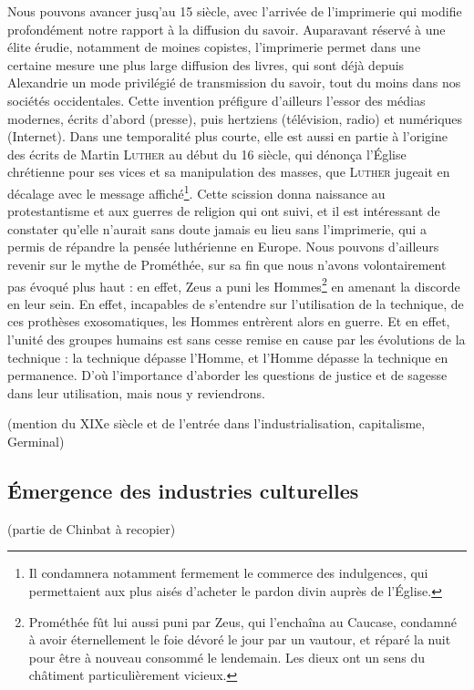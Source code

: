 \documentclass[a4paper,12pt]{report}
\begin{document}
Nous pouvons avancer jusq'au 15 siècle, avec l'arrivée de l'imprimerie qui modifie profondément notre rapport à la diffusion du savoir. Auparavant réservé à une élite érudie, notamment de moines copistes, l'imprimerie permet dans une certaine mesure une plus large diffusion des livres, qui sont déjà depuis Alexandrie un mode privilégié de transmission du savoir, tout du moins dans nos sociétés occidentales. Cette invention préfigure d'ailleurs l'essor des médias modernes, écrits d'abord (presse), puis hertziens (télévision, radio) et numériques (Internet). Dans une temporalité plus courte, elle est aussi en partie à l'origine des écrits de Martin \textsc{Luther} au début du 16 siècle, qui dénonça l'Église chrétienne pour ses vices et sa manipulation des masses, que \textsc{Luther} jugeait en décalage avec le message affiché\footnote{Il condamnera notamment fermement le commerce des indulgences, qui permettaient aux plus aisés d'acheter le pardon divin auprès de l'Église.}. Cette scission donna naissance au protestantisme et aux guerres de religion qui ont suivi, et il est intéressant de constater qu'elle n'aurait sans doute jamais eu lieu sans l'imprimerie, qui a permis de répandre la pensée luthérienne en Europe. Nous pouvons d'ailleurs revenir sur le mythe de Prométhée, sur sa fin que nous n'avons volontairement pas évoqué plus haut : en effet, Zeus a puni les Hommes\footnote{Prométhée fût lui aussi puni par Zeus, qui l'enchaîna au Caucase, condamné à avoir éternellement le foie dévoré le jour par un vautour, et réparé la nuit pour être à nouveau consommé le lendemain. Les dieux ont un sens du châtiment particulièrement vicieux.} en amenant la discorde en leur sein. En effet, incapables de s'entendre sur l'utilisation de la technique, de ces prothèses exosomatiques, les Hommes entrèrent alors en guerre. Et en effet, l'unité des groupes humains est sans cesse remise en cause par les évolutions de la technique : la technique dépasse l'Homme, et l'Homme dépasse la technique en permanence. D'où l'importance d'aborder les questions de justice et de sagesse dans leur utilisation, mais nous y reviendrons.

(mention du XIXe siècle et de l'entrée dans l'industrialisation, capitalisme, Germinal)

\subsection{Émergence des industries culturelles}

(partie de Chinbat à recopier) 
\end{document}
